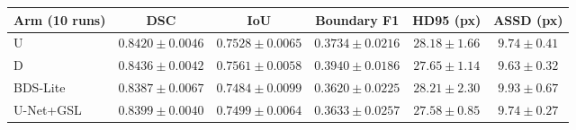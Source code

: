 \begin{tabular}{@{}lccccc@{}}
\toprule
Arm (10 runs) & DSC & IoU & Boundary F1 & HD95 (px) & ASSD (px) \\
\midrule
U & $0.8420 \pm 0.0046$ & $0.7528 \pm 0.0065$ & $0.3734 \pm 0.0216$ & $28.18 \pm 1.66$ & $9.74 \pm 0.41$ \\
D & $0.8436 \pm 0.0042$ & $0.7561 \pm 0.0058$ & $0.3940 \pm 0.0186$ & $27.65 \pm 1.14$ & $9.63 \pm 0.32$ \\
BDS-Lite & $0.8387 \pm 0.0067$ & $0.7484 \pm 0.0099$ & $0.3620 \pm 0.0225$ & $28.21 \pm 2.30$ & $9.93 \pm 0.67$ \\
U-Net+GSL & $0.8399 \pm 0.0040$ & $0.7499 \pm 0.0064$ & $0.3633 \pm 0.0257$ & $27.58 \pm 0.85$ & $9.74 \pm 0.27$ \\
\bottomrule
\end{tabular}
